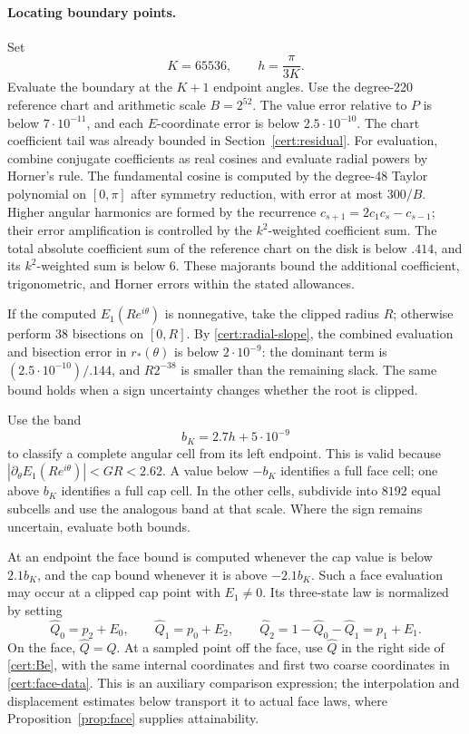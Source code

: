 \documentclass[11pt]{article}
\numberwithin{equation}{section}
\theoremstyle{definition}
\theoremstyle{remark}
\begin{document}
\paragraph{Locating boundary points.}
Set
\[
 K=65536,\qquad h=\frac{\pi}{3K}.
\]
Evaluate the boundary at the $K+1$ endpoint angles.  Use the degree-220
reference chart and arithmetic scale $B=2^{52}$.  The value error relative
to $P$ is below $7\cdot10^{-11}$, and each $E$-coordinate error is below
$2.5\cdot10^{-10}$.  The chart coefficient tail was already bounded in
Section~\ref{cert:residual}.  For evaluation, combine conjugate coefficients
as real cosines and evaluate radial powers by Horner's rule.  The fundamental cosine is computed by the degree-48 Taylor polynomial
on $[0,\pi]$ after symmetry reduction, with error at most $300/B$.
Higher angular harmonics are formed by the recurrence
$c_{s+1}=2c_1c_s-c_{s-1}$; their error amplification is controlled by
the $k^2$-weighted coefficient sum.  The total absolute coefficient
sum of the reference chart on the disk is below $.414$, and its
$k^2$-weighted sum is below 6.  These majorants bound the additional
coefficient, trigonometric, and Horner errors within the stated
allowances.

If the computed $E_1(Re^{i\theta})$ is nonnegative, take the clipped
radius $R$; otherwise perform 38 bisections on $[0,R]$.  By
\eqref{cert:radial-slope}, the combined evaluation and bisection error in
$r_*(\theta)$ is below $2\cdot10^{-9}$: the dominant term is
$(2.5\cdot10^{-10})/.144$, and $R2^{-38}$ is smaller than the remaining
slack.  The same bound holds when a sign uncertainty changes whether the
root is clipped.

Use the band
\begin{equation}\label{cert:band}
 b_K=2.7h+5\cdot10^{-9}
\end{equation}
to classify a complete angular cell from its left endpoint.  This is
valid because $|\partial_\theta E_1(Re^{i\theta})|<GR<2.62$.  A value
below $-b_K$ identifies a full face cell; one above $b_K$ identifies a
full cap cell.  In the other cells, subdivide into $8192$ equal subcells
and use the analogous band at that scale.  Where the sign remains
uncertain, evaluate both bounds.

At an endpoint the face bound is computed whenever the cap value is
below $2.1b_K$, and the cap bound whenever it is above $-2.1b_K$.
Such a face evaluation may occur at a clipped cap point with $E_1\ne0$.
Its three-state law is normalized by setting
\[
 \widehat Q_0=p_2+E_0,\qquad
 \widehat Q_1=p_0+E_2,\qquad
 \widehat Q_2=1-\widehat Q_0-\widehat Q_1=p_1+E_1.
\]
On the face, $\widehat Q=Q$.  At a sampled point off the face, use
$\widehat Q$ in the right side of \eqref{cert:Be}, with the same
internal coordinates and first two coarse coordinates in
\eqref{cert:face-data}.  This is an auxiliary comparison expression;
the interpolation and displacement estimates below transport it to actual
face laws, where Proposition~\ref{prop:face} supplies attainability.
\end{document}
